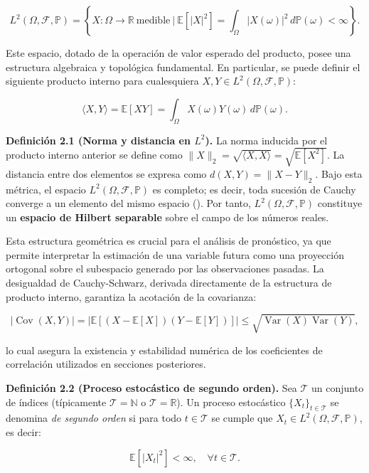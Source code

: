 \documentclass[
  spanish,
  us-letterpaper,
]{scrreprt}
\numberwithin{equation}{section}
\begin{document}
\[
L^2(\Omega, \mathcal{F}, \mathbb{P}) = \left\{ X : \Omega \to \mathbb{R} \ \text{medible} \ \bigg| \ \mathbb{E}[|X|^2] = \int_\Omega |X(\omega)|^2 \, d\mathbb{P}(\omega) < \infty \right\}.
\]

Este espacio, dotado de la operación de valor esperado del producto,
posee una estructura algebraica y topológica fundamental. En particular,
se puede definir el siguiente producto interno para cualesquiera
\(X, Y \in L^2(\Omega, \mathcal{F}, \mathbb{P})\):

\[
\langle X, Y \rangle = \mathbb{E}[XY] = \int_\Omega X(\omega)Y(\omega) \, d\mathbb{P}(\omega).
\]

\textbf{Definición 2.1 (Norma y distancia en \(L^2\)).} La norma
inducida por el producto interno anterior se define como
\(\|X\|_2 = \sqrt{\langle X, X \rangle} = \sqrt{\mathbb{E}[X^2]}\). La
distancia entre dos elementos se expresa como \(d(X,Y) = \|X - Y\|_2\).
Bajo esta métrica, el espacio \(L^2(\Omega, \mathcal{F}, \mathbb{P})\)
es completo; es decir, toda sucesión de Cauchy converge a un elemento
del mismo espacio (). Por tanto,
\(L^2(\Omega, \mathcal{F}, \mathbb{P})\) constituye un \textbf{espacio
de Hilbert separable} sobre el campo de los números reales.

Esta estructura geométrica es crucial para el análisis de pronóstico, ya
que permite interpretar la estimación de una variable futura como una
proyección ortogonal sobre el subespacio generado por las observaciones
pasadas. La desigualdad de Cauchy-Schwarz, derivada directamente de la
estructura de producto interno, garantiza la acotación de la covarianza:

\[
|\operatorname{Cov}(X,Y)| = |\mathbb{E}[(X-\mathbb{E}[X])(Y-\mathbb{E}[Y])]| \leq \sqrt{\operatorname{Var}(X)\operatorname{Var}(Y)},
\]

lo cual asegura la existencia y estabilidad numérica de los coeficientes
de correlación utilizados en secciones posteriores.

\textbf{Definición 2.2 (Proceso estocástico de segundo orden).} Sea
\(\mathcal{T}\) un conjunto de índices (típicamente
\(\mathcal{T} = \mathbb{N}\) o \(\mathcal{T} = \mathbb{R}\)). Un proceso
estocástico \(\{X_t\}_{t \in \mathcal{T}}\) se denomina \emph{de segundo
orden} si para todo \(t \in \mathcal{T}\) se cumple que
\(X_t \in L^2(\Omega, \mathcal{F}, \mathbb{P})\), es decir:

\[
\mathbb{E}[|X_t|^2] < \infty, \quad \forall t \in \mathcal{T}.
\]
\end{document}
